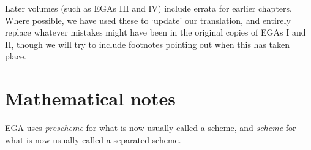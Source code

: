 \sectionbreak

Later volumes (such as EGAs III and IV) include errata for earlier chapters.
Where possible, we have used these to `update' our translation, and entirely replace whatever mistakes might have been in the original copies of EGAs I and II, though we will try to include footnotes pointing out when this has taken place.

\section*{Mathematical notes}
EGA uses \emph{prescheme} for what is now usually called a scheme, and \emph{scheme} for what is now usually called a separated scheme.

\nocite{*}





